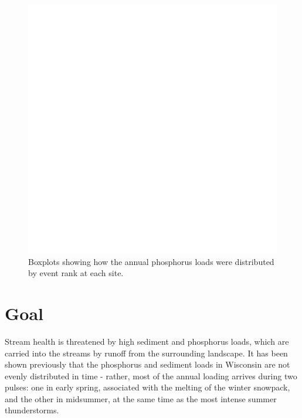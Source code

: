 \documentclass[10pt]{article}
\begin{document}
\begin{figure}[h]
    \begin{center}
\includegraphics{loadings-show-cumulative-phosphorus-boxplots}
    \caption{Boxplots showing how the annual phosphorus loads were distributed by event rank at each site.\label{cumulative-phosphorus-boxplots}}
    \end{center}
\end{figure}







\section{Goal}
Stream health is threatened by high sediment and phosphorus loads, which are carried into the streams by runoff from the surrounding landscape. It has been shown previously\cite{Danz:2010} that the phosphorus and sediment loads in Wisconsin are not evenly distributed in time - rather, most of the annual loading arrives during two pulses: one in early spring, associated with the melting of the winter snowpack, and the other in midsummer, at the same time as the most intense summer thunderstorms.\\
\end{document}
